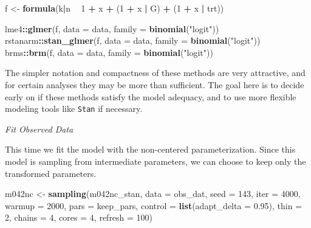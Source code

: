 \documentclass[11pt, oneside, openany]{scrbook}
\newenvironment{Shaded}{\begin{snugshade}}{\end{snugshade}}
\newcommand{\DataTypeTok}[1]{\textcolor[rgb]{0.13,0.29,0.53}{#1}}
\newcommand{\DecValTok}[1]{\textcolor[rgb]{0.00,0.00,0.81}{#1}}
\newcommand{\FloatTok}[1]{\textcolor[rgb]{0.00,0.00,0.81}{#1}}
\newcommand{\KeywordTok}[1]{\textcolor[rgb]{0.13,0.29,0.53}{\textbf{#1}}}
\newcommand{\NormalTok}[1]{#1}
\newcommand{\OperatorTok}[1]{\textcolor[rgb]{0.81,0.36,0.00}{\textbf{#1}}}
\newcommand{\StringTok}[1]{\textcolor[rgb]{0.31,0.60,0.02}{#1}}
\begin{document}
\begin{Shaded}
\begin{Highlighting}[]
\NormalTok{f <-}\StringTok{ }\KeywordTok{formula}\NormalTok{(k}\OperatorTok{|}\NormalTok{n }\OperatorTok{~}\StringTok{ }\DecValTok{1} \OperatorTok{+}\StringTok{ }\NormalTok{x }\OperatorTok{+}\StringTok{ }\NormalTok{(}\DecValTok{1} \OperatorTok{+}\StringTok{ }\NormalTok{x }\OperatorTok{|}\StringTok{ }\NormalTok{G) }\OperatorTok{+}\StringTok{ }\NormalTok{(}\DecValTok{1} \OperatorTok{+}\StringTok{ }\NormalTok{x }\OperatorTok{|}\StringTok{ }\NormalTok{trt))}

\NormalTok{lme4}\OperatorTok{::}\KeywordTok{glmer}\NormalTok{(f, }\DataTypeTok{data =}\NormalTok{ data, }\DataTypeTok{family =} \KeywordTok{binomial}\NormalTok{(}\StringTok{"logit"}\NormalTok{))}
\NormalTok{rstanarm}\OperatorTok{::}\KeywordTok{stan_glmer}\NormalTok{(f, }\DataTypeTok{data =}\NormalTok{ data, }\DataTypeTok{family =} \KeywordTok{binomial}\NormalTok{(}\StringTok{"logit"}\NormalTok{))}
\NormalTok{brms}\OperatorTok{::}\KeywordTok{brm}\NormalTok{(f, }\DataTypeTok{data =}\NormalTok{ data, }\DataTypeTok{family =} \KeywordTok{binomial}\NormalTok{(}\StringTok{"logit"}\NormalTok{))}
\end{Highlighting}
\end{Shaded}


The simpler notation and compactness of these methods are very attractive, and for certain analyses they may be more than sufficient. The goal here is to decide early on if these methods satisfy the model adequacy, and to use more flexible modeling tools like \texttt{Stan} if necessary.

\emph{Fit Observed Data}

This time we fit the model with the non-centered parameterization. Since this model is sampling from intermediate parameters, we can choose to keep only the transformed parameters.


\begin{Shaded}
\begin{Highlighting}[]
\NormalTok{m042nc <-}\StringTok{ }\KeywordTok{sampling}\NormalTok{(m042nc_stan, }\DataTypeTok{data =}\NormalTok{ obs_dat, }\DataTypeTok{seed =} \DecValTok{143}\NormalTok{,}
                   \DataTypeTok{iter =} \DecValTok{4000}\NormalTok{, }\DataTypeTok{warmup =} \DecValTok{2000}\NormalTok{, }\DataTypeTok{pars =}\NormalTok{ keep_pars,}
                   \DataTypeTok{control =} \KeywordTok{list}\NormalTok{(}\DataTypeTok{adapt_delta =} \FloatTok{0.95}\NormalTok{), }\DataTypeTok{thin =} \DecValTok{2}\NormalTok{,}
                   \DataTypeTok{chains =} \DecValTok{4}\NormalTok{, }\DataTypeTok{cores =} \DecValTok{4}\NormalTok{, }\DataTypeTok{refresh =} \DecValTok{100}\NormalTok{)}
\end{Highlighting}
\end{Shaded}
\end{document}
